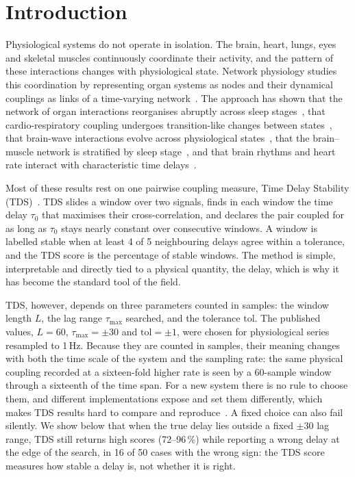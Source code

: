 \documentclass[11pt,a4paper]{article}
\begin{document}
\section{Introduction}
\label{sec:intro}
Physiological systems do not operate in isolation. The brain, heart, lungs, eyes and skeletal muscles continuously coordinate their activity, and the pattern of these interactions changes with physiological state. Network physiology studies this coordination by representing organ systems as nodes and their dynamical couplings as links of a time-varying network~\cite{Bashan2012NetworkPhysiology,Bartsch2015NetworkPhysiology,Ivanov2016FocusEmerging,Ivanov2021NewField}. The approach has shown that the network of organ interactions reorganises abruptly across sleep stages~\cite{Bashan2012NetworkPhysiology,Bartsch2015NetworkPhysiology}, that cardio-respiratory coupling undergoes transition-like changes between states~\cite{Bartsch2012PhaseTransitions}, that brain-wave interactions evolve across physiological states~\cite{Liu2015PlasticityBrain,Liu2015MajorComponent}, that the brain--muscle network is stratified by sleep stage~\cite{Rizzo2020NetworkPhysiology,Rizzo2022DynamicNetworks}, and that brain rhythms and heart rate interact with characteristic time delays~\cite{Lin2016DelaycorrelationLandscape}.

Most of these results rest on one pairwise coupling measure, Time Delay Stability (TDS)~\cite{Bashan2012NetworkPhysiology,Bartsch2015NetworkPhysiology}. TDS slides a window over two signals, finds in each window the time delay $\tau_0$ that maximises their cross-correlation, and declares the pair coupled for as long as $\tau_0$ stays nearly constant over consecutive windows. A window is labelled stable when at least 4 of 5 neighbouring delays agree within a tolerance, and the TDS score is the percentage of stable windows. The method is simple, interpretable and directly tied to a physical quantity, the delay, which is why it has become the standard tool of the field.

TDS, however, depends on three parameters counted in samples: the window length $L$, the lag range $\tau_{\max}$ searched, and the tolerance $\mathrm{tol}$. The published values, $L = 60$, $\tau_{\max} = \pm 30$ and $\mathrm{tol} = \pm 1$, were chosen for physiological series resampled to 1\,Hz. Because they are counted in samples, their meaning changes with both the time scale of the system and the sampling rate: the same physical coupling recorded at a sixteen-fold higher rate is seen by a 60-sample window through a sixteenth of the time span. For a new system there is no rule to choose them, and different implementations expose and set them differently, which makes TDS results hard to compare and reproduce~\cite{Steinbrinker2024TdspyOpensource}. A fixed choice can also fail silently. We show below that when the true delay lies outside a fixed $\pm30$ lag range, TDS still returns high scores (72--96\,\%) while reporting a wrong delay at the edge of the search, in 16 of 50 cases with the wrong sign: the TDS score measures how stable a delay is, not whether it is right.
\end{document}
